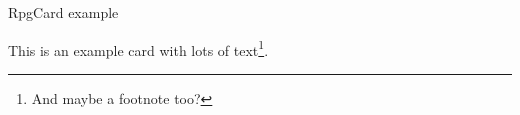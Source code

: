 \begin{ExampleBlock}{RpgCard example}
\begin{RpgCard}[vmargin=0.1cm, hmargin=0.1cm, height=5.2cm, width=3.6cm]
    \raggedright\footnotesize  This is an example card with lots of text\footnote{And maybe a footnote too?}.
    \lipsum[2]
\end{RpgCard}


\end{ExampleBlock}
